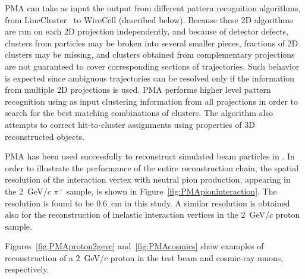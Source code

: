 PMA can take as input the output from different pattern recognition algorithms, from
LineCluster~\cite{linecluster} to WireCell (described below).  Because these 2D algorithms
are run on each 2D projection independently, and because of detector defects,
clusters from  particles may be broken
into several smaller pieces, fractions of 2D clusters may be missing,
and clusters obtained from complementary projections are not guaranteed to cover corresponding
sections of trajectories. Such behavior is expected since ambiguous 
trajectories can be resolved only if the information from multiple 2D projections is used.
PMA performs higher level pattern recognition using as input clustering information from all
projections in order to search for the best matching combinations of clusters. The algorithm
also attempts to correct hit-to-cluster assignments using properties of 3D reconstructed objects.

PMA has been used successfully to reconstruct simulated beam particles in
\pdsp. In order to illustrate the performance of the entire reconstruction chain,
the spatial resolution of the interaction vertex with neutral pion
production, appearing in the 2~GeV/$c$ $\pi^+$ sample, is shown in Figure~\ref{fig:PMApioninteraction}.
The resolution is found to be 0.6~cm in this study.
A similar resolution is obtained also for the reconstruction
of inelastic interaction vertices in the 2~GeV/$c$ proton sample. 


Figures~\ref{fig:PMAproton2gevc}
and~\ref{fig:PMAcosmics} show examples of reconstruction of a 2~GeV/$c$ proton in the test beam and
cosmic-ray muons, respectively.

